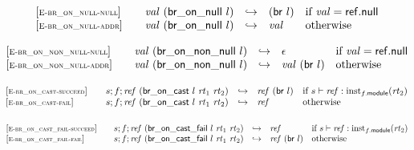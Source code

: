 \vspace{1ex}

$$
\begin{array}[t]{@{}lrcl@{}l@{}}
{[\textsc{\scriptsize E{-}br\_on\_null{-}null}]} \quad & {\mathit{val}}~(\mathsf{br\_on\_null}~l) & \hookrightarrow & (\mathsf{br}~l) & \quad \mbox{if}~ {\mathit{val}} = \mathsf{ref{.}null} \\
{[\textsc{\scriptsize E{-}br\_on\_null{-}addr}]} \quad & {\mathit{val}}~(\mathsf{br\_on\_null}~l) & \hookrightarrow & {\mathit{val}} & \quad \mbox{otherwise} \\
\end{array}
$$

\vspace{1ex}

$$
\begin{array}[t]{@{}lrcl@{}l@{}}
{[\textsc{\scriptsize E{-}br\_on\_non\_null{-}null}]} \quad & {\mathit{val}}~(\mathsf{br\_on\_non\_null}~l) & \hookrightarrow & \epsilon & \quad \mbox{if}~ {\mathit{val}} = \mathsf{ref{.}null} \\
{[\textsc{\scriptsize E{-}br\_on\_non\_null{-}addr}]} \quad & {\mathit{val}}~(\mathsf{br\_on\_non\_null}~l) & \hookrightarrow & {\mathit{val}}~(\mathsf{br}~l) & \quad \mbox{otherwise} \\
\end{array}
$$

\vspace{1ex}

$$
\begin{array}[t]{@{}lrcl@{}l@{}}
{[\textsc{\scriptsize E{-}br\_on\_cast{-}succeed}]} \quad & s ; f ; {\mathit{ref}}~(\mathsf{br\_on\_cast}~l~{\mathit{rt}}_1~{\mathit{rt}}_2) & \hookrightarrow & {\mathit{ref}}~(\mathsf{br}~l) & \quad \mbox{if}~ s \vdash {\mathit{ref}} : {{\mathrm{inst}}}_{f{.}\mathsf{module}}({\mathit{rt}}_2) \\
{[\textsc{\scriptsize E{-}br\_on\_cast{-}fail}]} \quad & s ; f ; {\mathit{ref}}~(\mathsf{br\_on\_cast}~l~{\mathit{rt}}_1~{\mathit{rt}}_2) & \hookrightarrow & {\mathit{ref}} & \quad \mbox{otherwise} \\
\end{array}
$$

\vspace{1ex}

$$
\begin{array}[t]{@{}lrcl@{}l@{}}
{[\textsc{\scriptsize E{-}br\_on\_cast\_fail{-}succeed}]} \quad & s ; f ; {\mathit{ref}}~(\mathsf{br\_on\_cast\_fail}~l~{\mathit{rt}}_1~{\mathit{rt}}_2) & \hookrightarrow & {\mathit{ref}} & \quad \mbox{if}~ s \vdash {\mathit{ref}} : {{\mathrm{inst}}}_{f{.}\mathsf{module}}({\mathit{rt}}_2) \\
{[\textsc{\scriptsize E{-}br\_on\_cast\_fail{-}fail}]} \quad & s ; f ; {\mathit{ref}}~(\mathsf{br\_on\_cast\_fail}~l~{\mathit{rt}}_1~{\mathit{rt}}_2) & \hookrightarrow & {\mathit{ref}}~(\mathsf{br}~l) & \quad \mbox{otherwise} \\
\end{array}
$$

